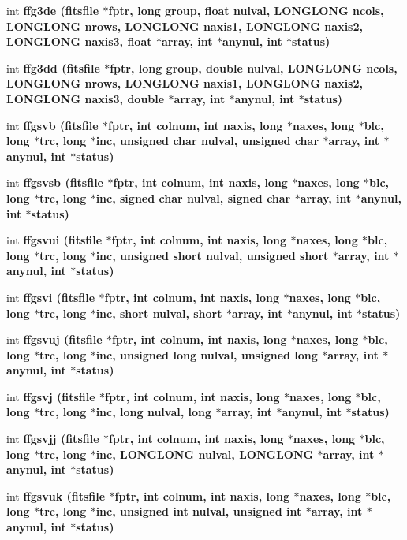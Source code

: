 \begin{CompactItemize}
\item 
int \bf{ffg3de} (\bf{fitsfile} $\ast$fptr, long group, float nulval, \bf{LONGLONG} ncols, \bf{LONGLONG} nrows, \bf{LONGLONG} naxis1, \bf{LONGLONG} naxis2, \bf{LONGLONG} naxis3, float $\ast$array, int $\ast$anynul, int $\ast$status)
\item 
int \bf{ffg3dd} (\bf{fitsfile} $\ast$fptr, long group, double nulval, \bf{LONGLONG} ncols, \bf{LONGLONG} nrows, \bf{LONGLONG} naxis1, \bf{LONGLONG} naxis2, \bf{LONGLONG} naxis3, double $\ast$array, int $\ast$anynul, int $\ast$status)
\item 
int \bf{ffgsvb} (\bf{fitsfile} $\ast$fptr, int colnum, int naxis, long $\ast$naxes, long $\ast$blc, long $\ast$trc, long $\ast$inc, unsigned char nulval, unsigned char $\ast$array, int $\ast$anynul, int $\ast$status)
\item 
int \bf{ffgsvsb} (\bf{fitsfile} $\ast$fptr, int colnum, int naxis, long $\ast$naxes, long $\ast$blc, long $\ast$trc, long $\ast$inc, signed char nulval, signed char $\ast$array, int $\ast$anynul, int $\ast$status)
\item 
int \bf{ffgsvui} (\bf{fitsfile} $\ast$fptr, int colnum, int naxis, long $\ast$naxes, long $\ast$blc, long $\ast$trc, long $\ast$inc, unsigned short nulval, unsigned short $\ast$array, int $\ast$anynul, int $\ast$status)
\item 
int \bf{ffgsvi} (\bf{fitsfile} $\ast$fptr, int colnum, int naxis, long $\ast$naxes, long $\ast$blc, long $\ast$trc, long $\ast$inc, short nulval, short $\ast$array, int $\ast$anynul, int $\ast$status)
\item 
int \bf{ffgsvuj} (\bf{fitsfile} $\ast$fptr, int colnum, int naxis, long $\ast$naxes, long $\ast$blc, long $\ast$trc, long $\ast$inc, unsigned long nulval, unsigned long $\ast$array, int $\ast$anynul, int $\ast$status)
\item 
int \bf{ffgsvj} (\bf{fitsfile} $\ast$fptr, int colnum, int naxis, long $\ast$naxes, long $\ast$blc, long $\ast$trc, long $\ast$inc, long nulval, long $\ast$array, int $\ast$anynul, int $\ast$status)
\item 
int \bf{ffgsvjj} (\bf{fitsfile} $\ast$fptr, int colnum, int naxis, long $\ast$naxes, long $\ast$blc, long $\ast$trc, long $\ast$inc, \bf{LONGLONG} nulval, \bf{LONGLONG} $\ast$array, int $\ast$anynul, int $\ast$status)
\item 
int \bf{ffgsvuk} (\bf{fitsfile} $\ast$fptr, int colnum, int naxis, long $\ast$naxes, long $\ast$blc, long $\ast$trc, long $\ast$inc, unsigned int nulval, unsigned int $\ast$array, int $\ast$anynul, int $\ast$status)

\end{CompactItemize}
